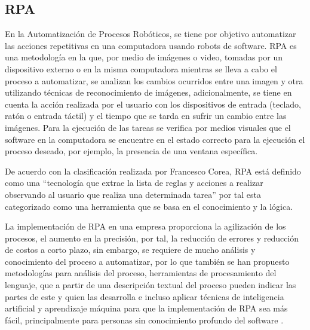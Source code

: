 \subsection{RPA}

En la Automatizaci\'on de Procesos Rob\'oticos,
 se tiene por objetivo automatizar las acciones
 repetitivas en una computadora usando robots de software. RPA es una 
 metodolog\'ia en la que, por medio de im\'agenes o video, tomadas por un 
 dispositivo externo o en la misma computadora mientras se lleva a cabo el 
 proceso a automatizar, se analizan los cambios ocurridos entre una imagen y 
 otra utilizando t\'ecnicas de reconocimiento de im\'agenes, adicionalmente,
 se tiene en cuenta la acci\'on realizada por el usuario con los dispositivos
 de entrada (teclado, rat\'on o entrada t\'actil) y el tiempo que se tarda en
 sufrir un cambio entre las im\'agenes. Para la ejecuci\'on de las tareas se 
 verifica por medios visuales que el software en la computadora se encuentre 
 en el estado correcto para la ejecuci\'on el proceso deseado, por ejemplo, 
 la presencia de una ventana espec\'ifica. 

De acuerdo con la clasificaci\'on realizada por Francesco Corea, RPA est\'a 
 definido como  una ``tecnolog\'ia que extrae la lista de reglas y acciones a 
 realizar observando al usuario que realiza una determinada tarea'' 
 \cite{Corea2019}  por tal esta categorizado como una herramienta que se basa 
 en el conocimiento y la l\'ogica.
 
La implementaci\'on de RPA en una empresa proporciona la agilizaci\'on de los 
 procesos, el aumento en la precisi\'on, por tal, la reducci\'on de errores y 
 reducci\'on de costos a corto plazo, sin embargo, se requiere de mucho 
 an\'alisis y conocimiento del proceso a automatizar, por lo que tambi\'en 
 se han propuesto metodolog\'ias para an\'alisis del proceso\cite{8592629,
 10.1007/978-3-319-74030-0_51}, herramientas de procesamiento del lenguaje, 
 que a partir de una descripci\'on textual del proceso pueden indicar las 
 partes de este y quien las desarrolla\cite{10.1007/978-3-319-91704-7_5} e 
 incluso aplicar t\'ecnicas de inteligencia artificial y aprendizaje 
 m\'aquina para que la implementaci\'on de RPA sea m\'as f\'acil, 
 principalmente para personas sin conocimiento profundo del software
 \cite{Mohanty2018}.
